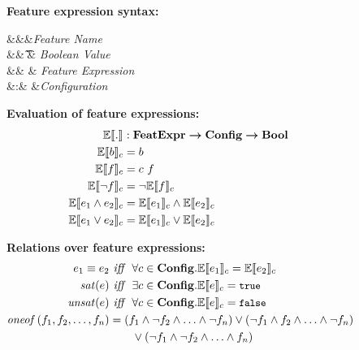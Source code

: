 \begin{figure}
%
\textbf{Feature expression syntax:}
\begin{syntax}
\synDef \fName \fSet &&&\textit{Feature Name}\\
\synDef \bTag \bSet &\eqq& \t \myOR \f & \textit{Boolean Value}\\
\synDef \dimMeta \ffSet &\eqq& \bTag \myOR \fName \myOR \neg \dimMeta \myOR \dimMeta \wedge \dimMeta \myOR \dimMeta \vee \dimMeta & \textit{Feature Expression}\\
\synDef \config \confSet &:& \fSet \totype \bSet &\textit{Configuration}
\end{syntax}

\medskip
\textbf{Evaluation of feature expressions:}
\begin{alignat*}{1}
\fSem [] . &: \ffSet \totype \confSet \totype \bSet\\
\fSem \bTag &= \bTag\\
\fSem \fName &= \config \ \fName\\
\fSem {\neg \fName} &= \neg \fSem \fName\\
\fSem {\annd \dimMeta} &= \fSem {\dimMeta_1} \wedge \fSem {\dimMeta_2}\\
\fSem {\orr \dimMeta} &= \fSem {\dimMeta_1} \vee \fSem {\dimMeta_2}\\
\end{alignat*}

\medskip
\textbf{Relations over feature expressions:}
\begin{alignat*}{1}
\dimMeta_1 \equiv \dimMeta_2 &\textit{ iff \ } \forall \config \in \confSet. \fSem {\dimMeta_1} = \fSem {\dimMeta_2}\\
\sat {\dimMeta} &\textit{ iff \ } \exists \config \in \confSet. \fSem {\dimMeta} = \t\\
\unsat {\dimMeta} &\textit{ iff \ } \forall \config \in \confSet. \fSem {\dimMeta} = \f\\
\oneof {\A, \B, \ldots, \fName_n}
&= (\A \wedge \neg \B \wedge \ldots \wedge \neg \fName_n)
\vee (\neg \A \wedge \B \wedge \ldots \wedge \neg \fName_n)\\
&\qquad\vee (\neg \A \wedge \neg \B \wedge \ldots \wedge \fName_n)
\end{alignat*}


\end{figure}
